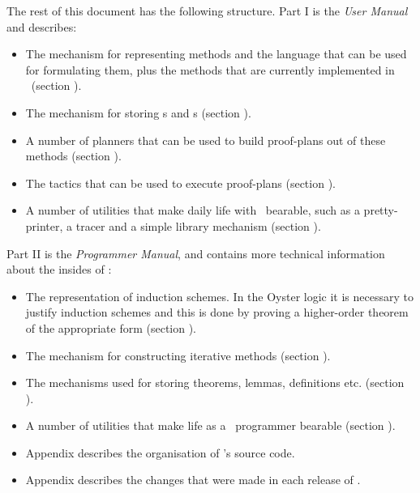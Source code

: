 The rest of this document has the following structure. Part I is the {\em
User Manual\/} and describes:
\begin{itemize}
\item
The mechanism for representing methods and the language that can be
used for formulating them, plus the methods that are currently
implemented in \clam\ (section ).
\item
The mechanism for storing s and s (section
).
\item
A number of planners that can be used to build proof-plans out of
these methods (section ).
\item
The tactics that can be used to execute proof-plans (section
).
\item
A number of utilities that make daily life with \clam\ bearable, such
as a pretty-printer, a tracer and a simple library mechanism (section
).

\iffalse
\item
The appendices \S\reference{top-level-preds},
\S\reference{library-preds},
\S\reference{method-ling-predicates-summary},
\S\reference{method-ling-connectives-summary} and
\S\reference{repertoire-summary} should also be regarded as part of
the {\em User Manual}.

Appendix \S\reference{top-level-preds} provides a
summary of the predicates that you are most likely to use when running
\clam. Appendix \S\reference{library-preds} does the same for the
predicates that can be used to operate {\clam}'s library mechanism.
Appendices \S\reference{method-ling-predicates-summary} and
\S\reference{method-ling-connectives-summary} summarise the predicates
and connectives that can be used when writing methods, and appendix
\S\reference{repertoire-summary} summarises the currently available
methods.
\fi
\end{itemize}

Part II is the {\em Programmer Manual}, and contains more technical
information about the insides of \clam:
\begin{itemize}
\item
The representation of induction schemes.  In the Oyster logic it is
necessary to justify induction schemes and this is done by proving a
higher-order theorem of the appropriate form (section ).
\item
The mechanism for constructing iterative methods (section
).
\item
The mechanisms used for storing theorems, lemmas, definitions etc.
(section ).
\item
A number of utilities that make life as a \clam\ programmer bearable
(section ).
\item
Appendix  describes the organisation of
{\clam}'s source code.
\item
Appendix  describes the changes that were
made in each release of \clam.
\end{itemize}

